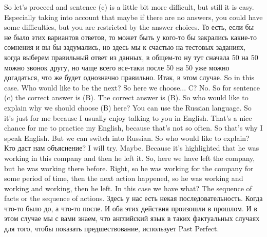 \documentclass[main.tex]{subfiles}
\begin{document}
So let's proceed and sentence (c) is a little bit more difficult, but still it is easy.
Especially taking into account that maybe if there are no answers, you could have some difficulties, but you are restricted by the answer choices.
То есть, если бы не было этих вариантов ответов, то может быть у кого-то бы закрались какие-то сомнения и вы бы задумались, но здесь мы к счастью на тестовых заданиях, когда выберем правильный ответ из данных, в общем-то ну тут сначала 50 на 50 можно звонок другу, но чаще всего все-таки после 50 на 50 уже можно догадаться, что же будет однозначно правильно.
Итак, в этом случае.
So in this case.
Who would like to be the next?
So here we choose...
C?
No.
So for sentence (c) the correct answer is (B).
The correct answer is (B).
So who would like to explain why we should choose (B) here? You can use the Russian language.
So it's just for me because I usually enjoy talking to you in English.
That's a nice chance for me to practice my English, because that's not so often.
So that's why I speak English.
But we can switch into Russian.
So who would like to explain?
Кто даст нам объяснение?
I will try.
Maybe.
Because it's highlighted that he was working in this company and then he left it.
So, here we have left the company, but he was working there before.
Right, so he was working for the company for some period of time, then the next action happened, so he was working and working and working, then he left.
In this case we have what?
The sequence of facts or the sequence of actions.
Здесь у нас есть некая последовательность.
Когда что-то было до, а что-то после.
И оба этих действия произошли в прошлом.
И в этом случае мы с вами знаем, что английский язык в таких фактуальных случаях для того, чтобы показать предшествование, использует Past Perfect.
\end{document}
